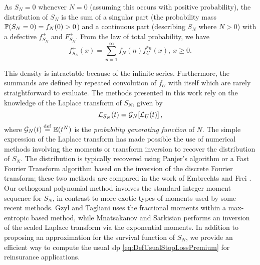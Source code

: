 As $S_N=0$ whenever $N=0$ (assuming this occurs with positive probability), the distribution of $S_N$ is the sum of a singular part (the probability mass $\P(S_N=0)=f_N(0)>0$) and a continuous part (describing $S_N$ where $N>0$) with a defective \pdf $f_{S_N}^+$ and \cdf $F_{S_N}^+$. From the law of total probability, we have
\begin{equation}\label{eq:DefectivePDFCompoundDistribution}
f_{S_N}^+(x)=\sum_{n=1}^{\infty}f_N(n)f_{U}^{\ast n}(x),~x\geq0.
\end{equation}

This density is intractable because of the infinite series. Furthermore, the summands are defined by repeated convolution of $f_{U}$ with itself which are rarely straightforward to evaluate. The methods presented in this work rely on the knowledge of the Laplace transform of $S_N$, given by
\begin{equation*}\label{eq:TransformsForCompoundDistribution}
\LTsub{S_N}(t) = \PGF_N[ \LTsub{U}(t) ] \,,
\end{equation*}
where $\PGF_N(t) \defeq \E (t^N)$ is the \emph{probability generating function} of $N$. The simple expression of the Laplace transform has made possible the use of numerical methods involving the moments or transform inversion to recover the distribution of $S_N$. The distribution is typically recovered using Panjer's algorithm or a Fast Fourier Transform algorithm based on the inversion of the discrete Fourier transform; these two methods are compared in the work of Embrechts and Frei \cite{EmFr09}. Our orthogonal polynomial method involves the standard integer moment sequence for $S_N$, in contrast to more exotic types of moments used by some recent methods. Gzyl and Tagliani \cite{GzTa12} uses the fractional moments within a max-entropic based method, while Mnatsakanov and Sarkisian \cite{Mnatsakanov2013} performs an inversion of the scaled Laplace transform via the exponential moments. In addition to proposing an approximation for the survival function of $S_N$, we provide an efficient way to compute the usual slp \eqref{eq:DefUsualStopLossPremium} for reinsurance applications.
%
